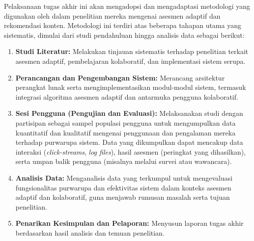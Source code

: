 \documentclass[12pt,a4paper,oneside]{book}
\begin{document}
Pelaksanaan tugas akhir ini akan mengadopsi dan mengadaptasi metodologi yang digunakan oleh \textcite{Vesin2022} dalam penelitian mereka mengenai asesmen adaptif dan rekomendasi konten. Metodologi ini terdiri atas beberapa tahapan utama yang sistematis, dimulai dari studi pendahuluan hingga analisis data sebagai berikut:

\begin{enumerate}
    \item \textbf{Studi Literatur:} Melakukan tinjauan sistematis terhadap penelitian terkait asesmen adaptif, pembelajaran kolaboratif, dan implementasi sistem serupa.
    
    \item \textbf{Perancangan dan Pengembangan Sistem:} Merancang arsitektur perangkat lunak serta mengimplementasikan modul-modul sistem, termasuk integrasi algoritma asesmen adaptif dan antarmuka pengguna kolaboratif.
    
    \item \textbf{Sesi Pengguna (Pengujian dan Evaluasi):} Melaksanakan studi dengan partisipan sebagai sampel populasi pengguna untuk mengumpulkan data kuantitatif dan kualitatif mengenai penggunaan dan pengalaman mereka terhadap purwarupa sistem. Data yang dikumpulkan dapat mencakup data interaksi (\textit{click-streams}, \textit{log files}), hasil asesmen (peringkat yang dihasilkan), serta umpan balik pengguna (misalnya melalui survei atau wawancara).
    
    \item \textbf{Analisis Data:} Menganalisis data yang terkumpul untuk mengevaluasi fungsionalitas purwarupa dan efektivitas sistem dalam konteks asesmen adaptif dan kolaboratif, guna menjawab rumusan masalah serta tujuan penelitian.
    
    \item \textbf{Penarikan Kesimpulan dan Pelaporan:} Menyusun laporan tugas akhir berdasarkan hasil analisis dan temuan penelitian.
\end{enumerate}

\end{document}
